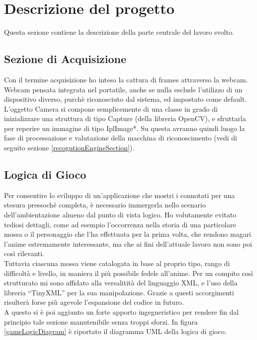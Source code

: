 \documentclass[a4paper,10pt, twocolumn]{article}
\begin{document}
  
\section{Descrizione del progetto}
Questa sezione contiene la descrizione della parte centrale del lavoro svolto.

  \subsection{Sezione di Acquisizione} 
  Con il termine acquisizione ho inteso la cattura di frames attraverso la webcam.
  Webcam pensata integrata nel portatile, anche se nulla esclude 
  l'utilizzo di un dispositivo diverso, purch\`{e} riconosciuto dal sistema, ed
  impostato come default.\\
  L'oggetto Camera si compone semplicemente di una
  classe in grado di inizializzare una struttura di tipo Capture (della libreria OpenCV),
  e sfruttarla per reperire un immagine di tipo IplImage*. Su questa avranno quindi
  luogo la fase di processazione e valutazione della macchina di riconoscimento
  (vedi di seguito sezione \ref{recogntionEngineSection}).
  
  \subsection{Logica di Gioco}
  Per consentire lo sviluppo di un'applicazione che mostri i connotati per una stesura 
  pressoch\'{e}  completa, 
  \`{e} necessario immergerla nello scenario dell'ambientazione almeno dal punto 
  di vista logico. Ho volutamente evitato tediosi dettagli, come ad esempio l'occorrenza nella
  storia
  di una particolare mossa o il personaggio che l'ha effettuata per la prima volta,
  che rendono magari
  l'anime estremamente interessante, 
  ma che ai fini dell'attuale
  lavoro non sono poi cos\`{i} rilevanti.\\
  Tuttavia ciascuna mossa viene catalogata in base al proprio tipo, rango di difficolt\`{a} e 
  livello, in maniera il pi\`{u} possibile fedele all'anime. Per un compito cos\`{i}
  strutturato mi sono affidato alla versalitit\`{a} del linguaggio XML, e l'uso della libreria
  ``TinyXML'' \cite{tinyXml} per la sua manipolazione. Grazie a questi accorgimenti 
  risulter\`{a} forse pi\`{u} agevole l'espansione del codice in futuro.\\
  A questo si \`{e} poi aggiunto un forte apporto ingegneristico per rendere fin dal 
  principio tale sezione manutenibile senza troppi sforzi.
  In figura \ref{gameLogicDiagram} \`{e} riportato il diagramma UML della logica di gioco.
   
\end{document}
